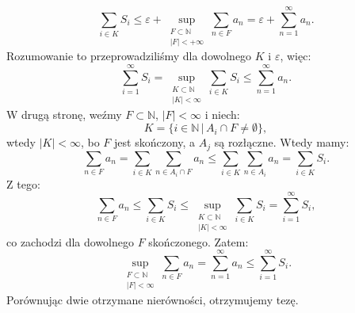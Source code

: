 \documentclass{article}
\numberwithin{defi}{section}
\numberwithin{defi}{section}
\newcommand{\N}{\mathbb{N}}
\newcommand{\oo}{\infty}
\begin{document}
\begin{dow}
\begin{enumerate}
              \[\sum_{i \in K} S_i \leqslant \varepsilon + \sup_{\substack{F\subset \N \\ |F| <  +\oo}} \sum_{n \in F} a_n = \varepsilon + \sum_{n=1}^{\oo} a_n.\]
              Rozumowanie to przeprowadziliśmy dla dowolnego $K$ i $\varepsilon$, więc:
              \[\sum_{i=1}^{\oo} S_i = \sup_{\substack{K \subset \N \\ |K| < \oo}} \sum_{i \in K} S_i \leqslant \sum_{n=1}^{\oo} a_n.\]
              W drugą stronę, weźmy $F \subset \N$, $|F| < \oo$ i niech:
              \[K = \{ i \in \N \, |\, A_i \cap F \neq \emptyset \},\]
              wtedy $|K| < \oo$, bo $F$ jest skończony, a $A_j$ są rozłączne. Wtedy mamy:
              \[\sum_{n\in F} a_n = \sum_{i\in K} \sum_{n \in A_i \cap F} a_n \leqslant \sum_{i \in K} \sum_{n \in A_i} a_n = \sum_{i \in K} S_i.\]
              Z tego:
              \[\sum_{n \in F} a_n \leqslant \sum_{i \in K} S_i \leqslant \sup_{\substack{K \subset \N \\ |K| < \oo}} \sum_{i \in K} S_i = \sum_{i =1}^{\oo} S_i, \]
              co zachodzi dla dowolnego $F$ skończonego. Zatem:
              \[\sup_{\substack{F \subset \N \\ |F| < \oo}}\sum_{n \in F} a_n = \sum_{n=1}^{\oo}a_n \leqslant \sum_{i =1}^{\oo} S_i.\]
              Porównując dwie otrzymane nierówności, otrzymujemy tezę.
    \end{enumerate}
\end{dow}
\end{document}
